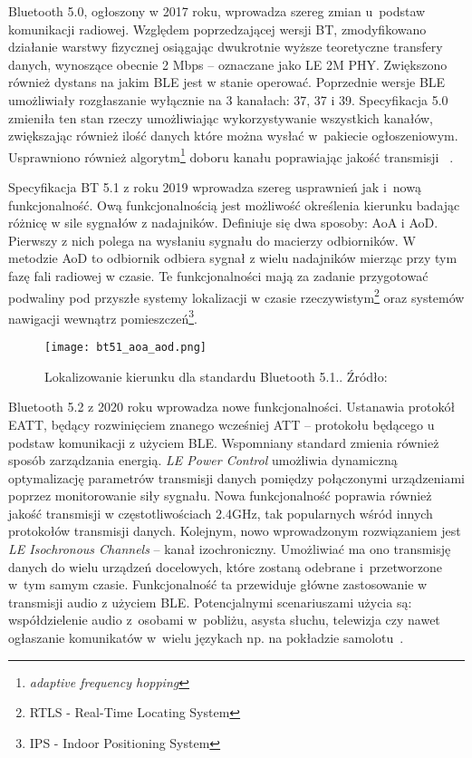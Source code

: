 Bluetooth 5.0, ogłoszony w 2017 roku, wprowadza szereg zmian u~podstaw komunikacji radiowej. Względem poprzedzającej wersji \gls{BT},
zmodyfikowano działanie warstwy fizycznej osiągając dwukrotnie wyższe teoretyczne transfery danych, wynoszące obecnie
2 Mbps -- oznaczane jako LE 2M PHY. Zwiększono również dystans na jakim \gls{BLE} jest w stanie operować. Poprzednie
wersje BLE umożliwiały rozgłaszanie wyłącznie na 3 kanałach: 37, 37 i 39. Specyfikacja 5.0 zmieniła ten stan rzeczy
umożliwiając wykorzystywanie wszystkich kanałów, zwiększając również ilość danych które można wysłać w~pakiecie
ogłoszeniowym. Usprawniono również algorytm\footnote{\textit{adaptive frequency hopping}} doboru kanału poprawiając jakość transmisji
~\cite{woolley_bluetooth_nodate}.

Specyfikacja \gls{BT} 5.1 z roku 2019 wprowadza szereg usprawnień jak i~nową funkcjonalność. Ową funkcjonalnością jest
możliwość określenia kierunku badając różnicę w sile sygnałów z nadajników. Definiuje się dwa sposoby:
\gls{AoA} i \gls{AoD}. Pierwszy z nich polega na wysłaniu sygnału do macierzy odbiorników. W metodzie \gls{AoD}
to odbiornik odbiera sygnał z wielu nadajników mierząc przy tym fazę fali radiowej w czasie. Te funkcjonalności
mają za zadanie przygotować podwaliny pod przyszłe systemy lokalizacji w czasie rzeczywistym\footnote{RTLS - Real-Time Locating System}
oraz systemów nawigacji wewnątrz pomieszczeń\footnote{IPS - Indoor Positioning System}\cite{woolley_bluetooth_2020-1}.

\begin{figure}[!ht]
	\centering \texttt{[image: bt51\_aoa\_aod.png]}
	\caption{Lokalizowanie kierunku dla standardu Bluetooth 5.1.. Źródło:~\cite{woolley_bluetooth_2020-1}}
	\label{rys:bt51_aoa_aod}
\end{figure}

Bluetooth 5.2 z 2020 roku wprowadza nowe funkcjonalności. Ustanawia protokół \gls{EATT}, będący rozwinięciem
znanego wcześniej \gls{ATT} -- protokołu będącego u podstaw komunikacji z użyciem \gls{BLE}. Wspomniany standard
zmienia również sposób zarządzania energią. \textit{LE Power Control} umożliwia dynamiczną optymalizację
parametrów transmisji danych pomiędzy połączonymi urządzeniami poprzez monitorowanie siły sygnału. Nowa funkcjonalność
poprawia również jakość transmisji w częstotliwościach 2.4GHz, tak popularnych wśród innych protokołów
transmisji danych. Kolejnym, nowo wprowadzonym rozwiązaniem jest \textit{LE Isochronous Channels} -- kanał izochroniczny.
Umożliwiać ma ono transmisję danych do wielu urządzeń docelowych, które zostaną odebrane i~przetworzone w~tym
samym czasie. Funkcjonalność ta przewiduje główne zastosowanie w transmisji audio z użyciem BLE. Potencjalnymi
scenariuszami użycia są: współdzielenie audio z~osobami w~pobliżu, asysta słuchu, telewizja czy nawet
ogłaszanie komunikatów w~wielu językach np. na pokładzie samolotu~\cite{woolley_bluetooth_2020-2}.

